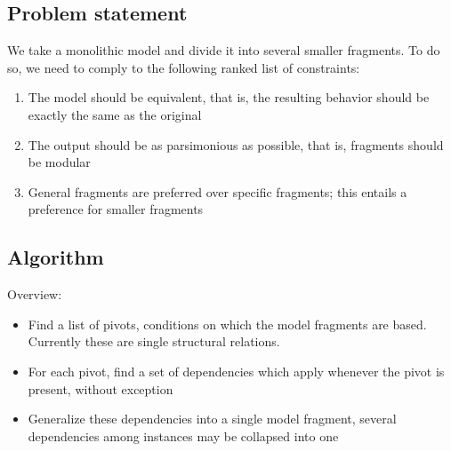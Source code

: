 \documentclass{article}
\begin{document}
\subsection{Problem statement}

We take a monolithic model and divide it into several smaller fragments. To do
so, we need to comply to the following ranked list of constraints:

\begin{enumerate}
\item The model should be equivalent, that is, the resulting behavior should be
	exactly the same as the original

\item The output should be as parsimonious as possible, that is, fragments
	should be modular

\item General fragments are preferred over specific fragments; this entails a
	preference for smaller fragments

\end{enumerate}

\subsection{Algorithm}

Overview:

\begin{itemize}

\item Find a list of pivots, conditions on which the model fragments are based.
	Currently these are single structural relations.

\item For each pivot, find a set of dependencies which apply whenever the pivot
	is present, without exception

\item Generalize these dependencies into a single model fragment, several
	dependencies among instances may be collapsed into one

\end{itemize}

%
%
\end{document}
